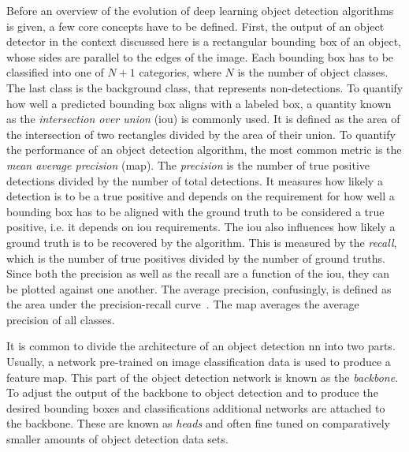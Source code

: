 Before an overview of the evolution of deep learning object detection algorithms is given, a few core concepts have to be defined. First, the output of an object detector in the context discussed here is a rectangular bounding box of an object, whose sides are parallel to the edges of the image. Each bounding box has to be classified into one of $N+1$ categories, where $N$ is the number of object classes. The last class is the background class, that represents non-detections. To quantify how well a predicted bounding box aligns with a labeled box, a quantity known as the \emph{intersection over union} (\acrshort{iou}) is commonly used. It is defined as the area of the intersection of two rectangles divided by the area of their union. To quantify the performance of an object detection algorithm, the most common metric is the \emph{mean average precision} (\acrshort{map}). The \emph{precision} is the number of true positive detections divided by the number of total detections. It measures how likely a detection is to be a true positive and depends on the requirement for how well a bounding box has to be aligned with the ground truth to be considered a true positive, i.e. it depends on \acrshort{iou} requirements. The \acrshort{iou} also influences how likely a ground truth is to be recovered by the algorithm. This is measured by the \emph{recall}, which is the number of true positives divided by the number of ground truths. Since both the precision as well as the recall are a function of the \acrshort{iou}, they can be plotted against one another. The average precision, confusingly, is defined as the area under the precision-recall curve~\cite{Yohanandan:2020aaa}. The \acrshort{map} averages the average precision of all classes.

It is common to divide the architecture of an object detection \acrshort{nn} into two parts. Usually, a network pre-trained on image classification data is used to produce a feature map. This part of the object detection network is known as the \emph{backbone}. To adjust the output of the backbone to object detection and to produce the desired bounding boxes and classifications additional networks are attached to the backbone. These are known as \emph{heads} and often fine tuned on comparatively smaller amounts of object detection data sets.

